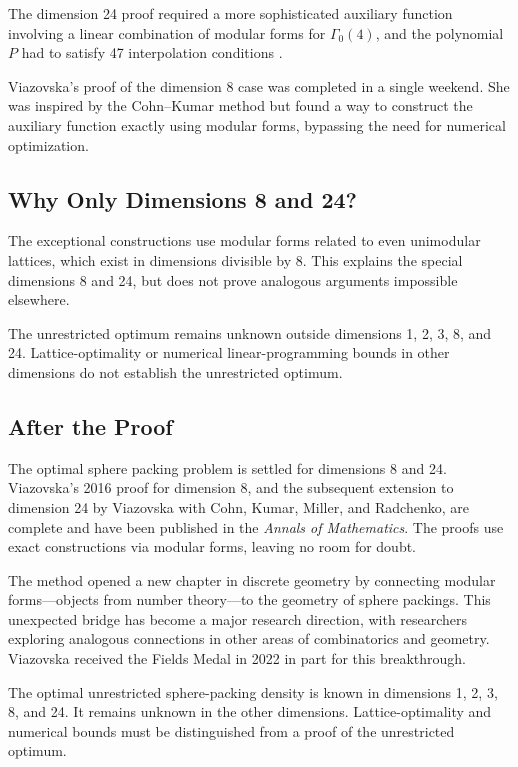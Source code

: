 The dimension 24 proof required a more sophisticated auxiliary function involving a linear combination of modular forms for $\Gamma_0(4)$, and the polynomial $P$ had to satisfy 47 interpolation conditions \cite{cohn2017}.

\begin{highlightbox}
Viazovska's proof of the dimension 8 case was completed in a single weekend. She was inspired by the Cohn--Kumar method but found a way to construct the auxiliary function exactly using modular forms, bypassing the need for numerical optimization.
\end{highlightbox}

\subsection{Why Only Dimensions 8 and 24?}

The exceptional constructions use modular forms related to even unimodular lattices, which exist in dimensions divisible by 8. This explains the special dimensions 8 and 24, but does not prove analogous arguments impossible elsewhere.

The unrestricted optimum remains unknown outside dimensions 1, 2, 3, 8, and 24. Lattice-optimality or numerical linear-programming bounds in other dimensions do not establish the unrestricted optimum.

\subsection{After the Proof}

The optimal sphere packing problem is settled for dimensions 8 and 24. Viazovska's 2016 proof for dimension 8, and the subsequent extension to dimension 24 by Viazovska with Cohn, Kumar, Miller, and Radchenko, are complete and have been published in the \emph{Annals of Mathematics}. The proofs use exact constructions via modular forms, leaving no room for doubt.

The method opened a new chapter in discrete geometry by connecting modular forms---objects from number theory---to the geometry of sphere packings. This unexpected bridge has become a major research direction, with researchers exploring analogous connections in other areas of combinatorics and geometry. Viazovska received the Fields Medal in 2022 in part for this breakthrough.

The optimal unrestricted sphere-packing density is known in dimensions 1, 2, 3, 8, and 24. It remains unknown in the other dimensions. Lattice-optimality and numerical bounds must be distinguished from a proof of the unrestricted optimum.

